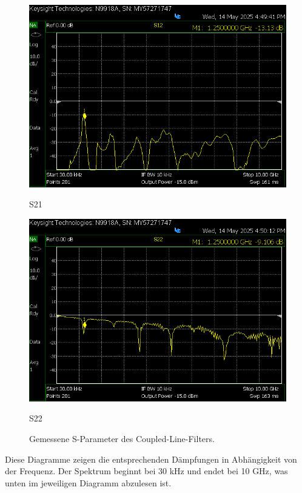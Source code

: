 \begin{figure}[H]
        \vspace{0.5cm}

        \begin{minipage}{0.45\textwidth}
            \centering
            \includegraphics[width=\linewidth]{Pictures/S12neuCooleGrupp.png}
            \caption*{S21}
        \end{minipage}
        \hfill
        \begin{minipage}{0.45\textwidth}
            \centering
            \includegraphics[width=\linewidth]{Pictures/S22neuCooleGruppe.png}
            \caption*{S22}
        \end{minipage}    
        \caption{Gemessene S-Parameter des Coupled-Line-Filters.}
        \label{fig:fieldfox_s_parameter}
    \end{figure}
    Diese Diagramme zeigen die entsprechenden Dämpfungen in Abhängigkeit von der Frequenz. Der Spektrum beginnt bei 30 kHz und endet bei 10 GHz, was unten im jeweiligen Diagramm abzulesen ist. 
    
